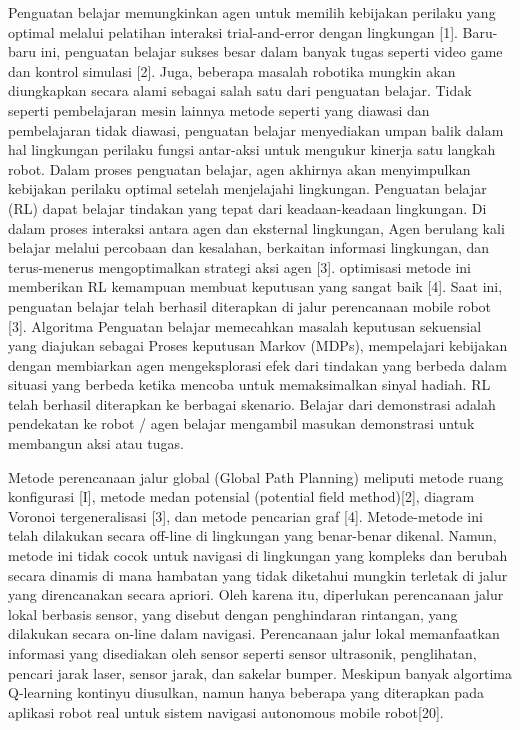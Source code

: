  Penguatan belajar memungkinkan agen untuk memilih kebijakan perilaku yang optimal melalui pelatihan interaksi trial-and-error dengan lingkungan [1]. Baru-baru ini, penguatan belajar sukses besar dalam banyak tugas seperti video game dan kontrol simulasi [2]. Juga, beberapa masalah robotika mungkin akan diungkapkan secara alami sebagai salah satu dari penguatan belajar. Tidak seperti pembelajaran mesin lainnya metode seperti yang diawasi dan pembelajaran tidak diawasi, penguatan belajar menyediakan umpan balik dalam hal lingkungan perilaku fungsi antar-aksi untuk mengukur kinerja satu langkah robot. Dalam proses penguatan belajar, agen akhirnya akan menyimpulkan kebijakan perilaku optimal setelah menjelajahi lingkungan. Penguatan belajar (RL) dapat belajar tindakan yang tepat dari keadaan-keadaan lingkungan. Di dalam proses interaksi antara agen dan eksternal lingkungan, Agen berulang kali belajar melalui percobaan dan kesalahan, berkaitan informasi lingkungan, dan terus-menerus mengoptimalkan strategi aksi agen [3]. optimisasi metode ini memberikan RL kemampuan membuat keputusan yang sangat baik [4]. Saat ini, penguatan belajar telah berhasil diterapkan di jalur perencanaan mobile robot [3]. Algoritma  Penguatan belajar memecahkan masalah keputusan sekuensial yang diajukan sebagai Proses keputusan Markov (MDPs), mempelajari kebijakan dengan membiarkan agen mengeksplorasi efek dari tindakan yang berbeda dalam situasi yang berbeda ketika mencoba untuk memaksimalkan sinyal hadiah. RL telah berhasil diterapkan ke berbagai skenario. Belajar dari demonstrasi adalah pendekatan ke robot / agen belajar mengambil masukan demonstrasi  untuk membangun aksi atau tugas.  

Metode perencanaan jalur global (Global Path Planning) meliputi metode ruang konfigurasi [I], metode medan potensial (potential field method)[2], diagram Voronoi tergeneralisasi [3], dan metode pencarian graf [4]. Metode-metode ini telah dilakukan secara off-line di lingkungan yang benar-benar dikenal. Namun, metode ini tidak cocok untuk navigasi di lingkungan yang kompleks dan berubah secara dinamis di mana hambatan yang tidak diketahui mungkin terletak di jalur yang direncanakan secara apriori. Oleh karena itu, diperlukan perencanaan jalur lokal berbasis sensor, yang disebut dengan penghindaran rintangan, yang dilakukan secara on-line dalam navigasi. Perencanaan jalur lokal memanfaatkan informasi yang disediakan oleh sensor seperti sensor ultrasonik, penglihatan, pencari jarak laser, sensor jarak, dan sakelar bumper. Meskipun banyak algortima Q-learning kontinyu diusulkan, namun hanya beberapa yang diterapkan pada aplikasi robot real untuk sistem navigasi autonomous mobile robot[20]. 
 

